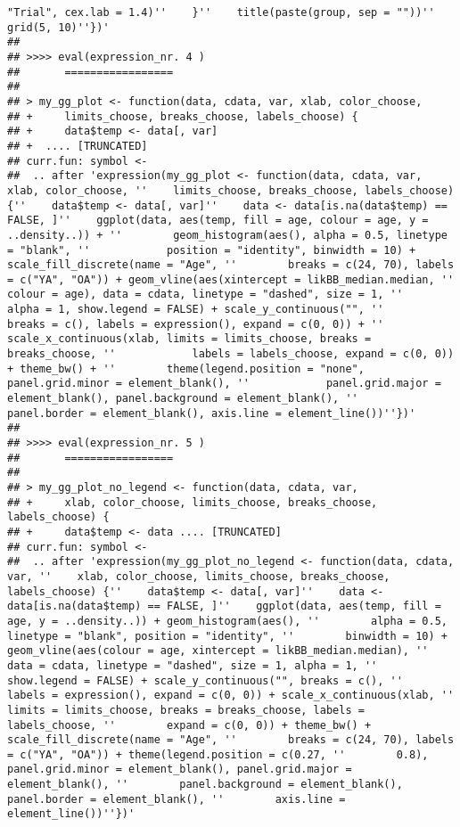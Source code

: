 \documentclass[11pt,,]{article}
\begin{document}
\begin{verbatim}
"Trial", cex.lab = 1.4)''    }''    title(paste(group, sep = ""))''    grid(5, 10)''})'
## 
## >>>> eval(expression_nr. 4 )
##       =================
## 
## > my_gg_plot <- function(data, cdata, var, xlab, color_choose, 
## +     limits_choose, breaks_choose, labels_choose) {
## +     data$temp <- data[, var]
## +  .... [TRUNCATED] 
## curr.fun: symbol <-
##  .. after 'expression(my_gg_plot <- function(data, cdata, var, xlab, color_choose, ''    limits_choose, breaks_choose, labels_choose) {''    data$temp <- data[, var]''    data <- data[is.na(data$temp) == FALSE, ]''    ggplot(data, aes(temp, fill = age, colour = age, y = ..density..)) + ''        geom_histogram(aes(), alpha = 0.5, linetype = "blank", ''            position = "identity", binwidth = 10) + scale_fill_discrete(name = "Age", ''        breaks = c(24, 70), labels = c("YA", "OA")) + geom_vline(aes(xintercept = likBB_median.median, ''        colour = age), data = cdata, linetype = "dashed", size = 1, ''        alpha = 1, show.legend = FALSE) + scale_y_continuous("", ''        breaks = c(), labels = expression(), expand = c(0, 0)) + ''        scale_x_continuous(xlab, limits = limits_choose, breaks = breaks_choose, ''            labels = labels_choose, expand = c(0, 0)) + theme_bw() + ''        theme(legend.position = "none", panel.grid.minor = element_blank(), ''            panel.grid.major = element_blank(), panel.background = element_blank(), ''            panel.border = element_blank(), axis.line = element_line())''})'
## 
## >>>> eval(expression_nr. 5 )
##       =================
## 
## > my_gg_plot_no_legend <- function(data, cdata, var, 
## +     xlab, color_choose, limits_choose, breaks_choose, labels_choose) {
## +     data$temp <- data .... [TRUNCATED] 
## curr.fun: symbol <-
##  .. after 'expression(my_gg_plot_no_legend <- function(data, cdata, var, ''    xlab, color_choose, limits_choose, breaks_choose, labels_choose) {''    data$temp <- data[, var]''    data <- data[is.na(data$temp) == FALSE, ]''    ggplot(data, aes(temp, fill = age, y = ..density..)) + geom_histogram(aes(), ''        alpha = 0.5, linetype = "blank", position = "identity", ''        binwidth = 10) + geom_vline(aes(colour = age, xintercept = likBB_median.median), ''        data = cdata, linetype = "dashed", size = 1, alpha = 1, ''        show.legend = FALSE) + scale_y_continuous("", breaks = c(), ''        labels = expression(), expand = c(0, 0)) + scale_x_continuous(xlab, ''        limits = limits_choose, breaks = breaks_choose, labels = labels_choose, ''        expand = c(0, 0)) + theme_bw() + scale_fill_discrete(name = "Age", ''        breaks = c(24, 70), labels = c("YA", "OA")) + theme(legend.position = c(0.27, ''        0.8), panel.grid.minor = element_blank(), panel.grid.major = element_blank(), ''        panel.background = element_blank(), panel.border = element_blank(), ''        axis.line = element_line())''})'
\end{verbatim}
\end{document}
